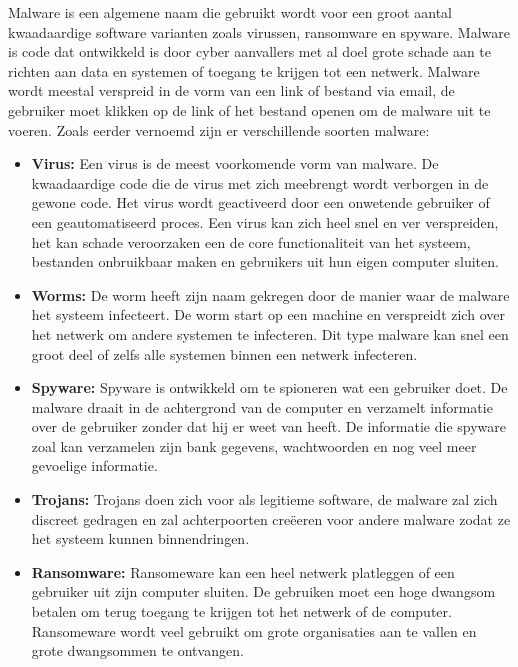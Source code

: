 Malware is een algemene naam die gebruikt wordt voor een groot aantal kwaadaardige software varianten zoals virussen, ransomware en spyware. Malware is code dat ontwikkeld is door cyber aanvallers met al doel grote schade aan te richten aan data en systemen of toegang te krijgen tot een netwerk. Malware wordt meestal verspreid  in de vorm van een link of bestand via email, de gebruiker moet klikken op de link of het bestand openen om de malware uit te voeren. Zoals eerder vernoemd zijn er verschillende soorten malware:

\begin{itemize}
	\item \textbf{Virus:} Een virus is de meest voorkomende vorm van malware. De kwaadaardige code die de virus met zich meebrengt wordt verborgen in de gewone code. Het virus wordt geactiveerd door een onwetende gebruiker of een geautomatiseerd proces. Een virus kan zich heel snel en ver verspreiden, het kan schade veroorzaken een de core functionaliteit van het systeem, bestanden onbruikbaar maken en gebruikers uit hun eigen computer sluiten.
	
	\item \textbf{Worms:} De worm heeft zijn naam gekregen door de manier waar de malware het systeem infecteert. De worm start op een machine en verspreidt zich over het netwerk om andere systemen te infecteren. Dit type malware kan snel een groot deel of zelfs alle systemen binnen een netwerk infecteren.
	
	\item \textbf{Spyware:} Spyware is ontwikkeld om te spioneren wat een gebruiker doet. De malware draait in de achtergrond van de computer en verzamelt informatie over de gebruiker zonder dat hij er weet van heeft. De informatie die spyware zoal kan verzamelen zijn bank gegevens, wachtwoorden en nog veel meer gevoelige informatie.
	
	\item \textbf{Trojans:} Trojans doen zich voor als legitieme software, de malware zal zich discreet gedragen en zal achterpoorten creëeren voor andere malware zodat ze het systeem kunnen binnendringen.
	
	\item \textbf{Ransomware:} Ransomeware kan een heel netwerk platleggen of een gebruiker uit zijn computer sluiten. De gebruiken moet een hoge dwangsom betalen om terug toegang te krijgen tot het netwerk of de computer. Ransomeware wordt veel gebruikt om grote organisaties aan te vallen en grote dwangsommen te ontvangen.
\end{itemize}

